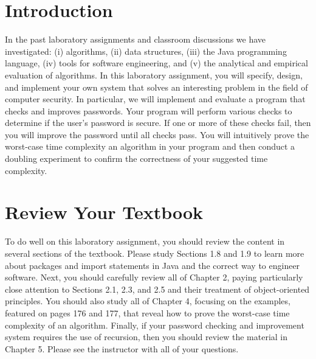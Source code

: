 

\usepackage[compact]{titlesec}


\section*{Introduction}

In the past laboratory assignments and classroom discussions we have investigated: (i) algorithms, (ii) data structures,
(iii) the Java programming language, (iv) tools for software engineering, and (v) the analytical and empirical
evaluation of algorithms. In this laboratory assignment, you will specify, design, and implement your own system that
solves an interesting problem in the field of computer security. In particular, we will implement and evaluate a program
that checks and improves passwords. Your program will perform various checks to determine if the user's password is
secure. If one or more of these checks fail, then you will improve the password until all checks pass. You will
intuitively prove the worst-case time complexity an algorithm in your program and then conduct a doubling experiment to
confirm the correctness of your suggested time complexity.

\vspace*{-.05in}
\section*{Review Your Textbook}
\vspace*{-.05in}

To do well on this laboratory assignment, you should review the content in several sections of the textbook. Please
study Sections 1.8 and 1.9 to learn more about packages and import statements in Java and the correct way to engineer
software. Next, you should carefully review all of Chapter 2, paying particularly close attention to Sections 2.1, 2.3,
and 2.5 and their treatment of object-oriented principles. You should also study all of Chapter 4, focusing on the
examples, featured on pages 176 and 177, that reveal how to prove the worst-case time complexity of an algorithm.
Finally, if your password checking and improvement system requires the use of recursion, then you should review the
material in Chapter 5. Please see the instructor with all of your questions.

